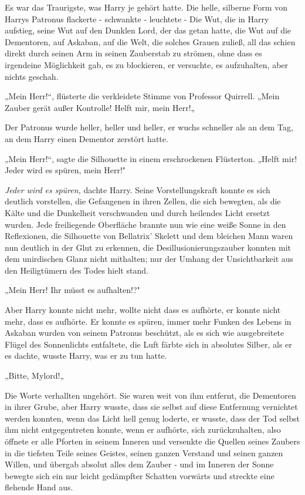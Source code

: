 {Es war das Traurigste, was Harry je gehört hatte. Die helle, silberne Form von Harrys Patronus flackerte - schwankte - leuchtete - Die Wut, die in Harry aufstieg, seine Wut auf den Dunklen Lord, der das getan hatte, die Wut auf die Dementoren, auf Askaban, auf die Welt, die solches Grauen zuließ, all das schien direkt durch seinen Arm in seinen Zauberstab zu strömen, ohne dass es irgendeine Möglichkeit gab, es zu blockieren, er versuchte, es aufzuhalten, aber nichts geschah.

„Mein Herr!“, flüsterte die verkleidete Stimme von Professor Quirrell. „Mein Zauber gerät außer Kontrolle! Helft mir, mein Herr!„

Der Patronus wurde heller, heller und heller, er wuchs schneller als an dem Tag, an dem Harry einen Dementor zerstört hatte.

„Mein Herr!“, sagte die Silhouette in einem erschrockenen Flüsterton. „Helft mir! Jeder wird es spüren, mein Herr!"

\emph{Jeder wird es spüren,} dachte Harry. Seine Vorstellungskraft konnte es sich deutlich vorstellen, die Gefangenen in ihren Zellen, die sich bewegten, als die Kälte und die Dunkelheit verschwanden und durch heilendes Licht ersetzt wurden. Jede freiliegende Oberfläche brannte nun wie eine weiße Sonne in den Reflexionen, die Silhouette von Bellatrix' Skelett und dem bleichen Mann waren nun deutlich in der Glut zu erkennen, die Desillusionierungszauber konnten mit dem unirdischen Glanz nicht mithalten; nur der Umhang der Unsichtbarkeit aus den Heiligtümern des Todes hielt stand.

„Mein Herr! Ihr müsst es aufhalten!?"

Aber Harry konnte nicht mehr, wollte nicht dass es aufhörte, er konnte nicht mehr, dass es aufhörte. Er konnte es spüren, immer mehr Funken des Lebens in Askaban wurden von seinem Patronus beschützt, als es sich wie ausgebreitete Flügel des Sonnenlichts entfaltete, die Luft färbte sich in absolutes Silber, als er es dachte, wusste Harry, was er zu tun hatte.

„Bitte, Mylord!„

Die Worte verhallten ungehört. Sie waren weit von ihm entfernt, die Dementoren in ihrer Grube, aber Harry wusste, dass sie selbst auf diese Entfernung vernichtet werden konnten, wenn das Licht hell genug loderte, er wusste, dass der Tod selbst ihm nicht entgegentreten konnte, wenn er aufhörte, sich zurückzuhalten, also öffnete er alle Pforten in seinem Inneren und versenkte die Quellen seines Zaubers in die tiefsten Teile seines Geistes, seinen ganzen Verstand und seinen ganzen Willen, und übergab absolut alles dem Zauber - und im Inneren der Sonne bewegte sich ein nur leicht gedämpfter Schatten vorwärts und streckte eine flehende Hand aus.\\

}
